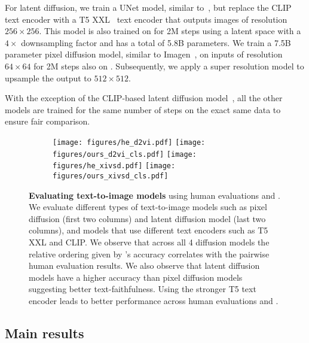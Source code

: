  For latent diffusion, we train a UNet model, similar to~\cite{rombach2022high}, but replace the CLIP text encoder with a T5 XXL~\cite{2020t5} text encoder
that outputs images of resolution $256\times256$.
This model is also trained on \DATASET for 2M steps using a latent space with a $4\times$ downsampling factor and has a total of 5.8B parameters.
We train a 7.5B parameter pixel diffusion model, similar to Imagen~\cite{Saharia2022PhotorealisticTD}, on inputs of resolution $64\times64$ for 2M steps also on \DATASET.
Subsequently, we apply a super resolution model to upsample the output to $512\times 512$.

With the exception of the CLIP-based latent diffusion model~\cite{rombach2022high}, all the other models are trained for the same number of steps on the exact same data to ensure fair comparison.
\begin{figure*}[!t]
    \centering
    \begin{subfigure}[b]{\textwidth}
        \centering
        \texttt{[image: figures/he\_d2vi.pdf]}\hfill
        \texttt{[image: figures/ours\_d2vi\_cls.pdf]}\label{exp:fig:main_res_pdm}
        \centering
        \texttt{[image: figures/he\_xivsd.pdf]}\hfill
        \texttt{[image: figures/ours\_xivsd\_cls.pdf]}

        \label{exp:fig:main_res_ldm}
    \end{subfigure}
    \caption{\textbf{Evaluating text-to-image models} using human evaluations and \OURS. We evaluate different types of text-to-image models such as pixel diffusion (first two columns) and latent diffusion model (last two columns), and models that use different text encoders such as T5 XXL and CLIP. We observe that across all 4 diffusion models the relative ordering given by \OURS's accuracy correlates with the pairwise human evaluation results. We also observe that latent diffusion models have a higher \OURS accuracy than pixel diffusion models suggesting better text-faithfulness.
    Using the stronger T5 text encoder leads to better performance across human evaluations and \OURS.
    }\vspace{-2em}
    \label{exp:fig:main_res_all}
\end{figure*}

\subsection{Main results}\label{subsec:exp:main_exp}

